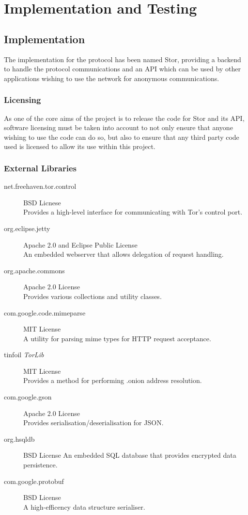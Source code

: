 \section{Implementation and Testing}
	\subsection{Implementation}
		The implementation for the protocol has been named Stor, providing a backend to handle the protocol communications and an API which can be used by other applications wishing to use the network for anonymous communications.
		\subsubsection*{Licensing}
			As one of the core aims of the project is to release the code for Stor and its API, software licensing must be taken into account to not only ensure that anyone wishing to use the code can do so, but also to ensure that any third party code used is licensed to allow its use within this project.
		\subsubsection*{External Libraries}
			\begin{description}
				\item[net.freehaven.tor.control] BSD Licnese \\
					Provides a high-level interface for communicating with Tor's control port.
				\item[org.eclipse.jetty] Apache 2.0 and Eclipse Public License \\
					An embedded webserver that allows delegation of request handling.
				\item[org.apache.commons] Apache 2.0 License \\
					Provides various collections and utility classes.
				\item[com.google.code.mimeparse] MIT License \\
					A utility for parsing mime types for HTTP request acceptance.
				\item[tinfoil \textit{TorLib}] MIT License \\
					Provides a method for performing .onion address resolution.
				\item[com.google.gson] Apache 2.0 License \\
					Provides serialisation/deserialisation for JSON.
				\item[org.hsqldb] BSD License
					An embedded SQL database that provides encrypted data persistence.
				\item[com.google.protobuf] BSD License \\
					A high-efficency data structure serialiser.
			\end{description}
